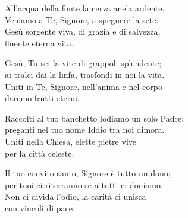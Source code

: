 
\strofa All'acqua della fonte la cerva anela ardente.\\
Veniamo a Te, Signore, a spegnere la sete.\\
Gesù sorgente viva, di grazia e di salvezza,\\
fluente eterna vita.

\spazio

\strofa Gesù, Tu sei la vite di grappoli splendente;\\
ai tralci dai la linfa, trasfondi in noi la vita.\\
Uniti in Te, Signore, nell'anima e nel corpo\\
daremo frutti eterni.

\spazio

\strofa Raccolti al tuo banchetto lodiamo un solo Padre:\\
preganti nel tuo nome Iddio tra noi dimora.\\
Uniti nella Chiesa, elette pietre vive\\
per la città celeste.

\spazio

\strofa Il tuo convito santo, Signore è tutto un dono;\\
per tuoi ci riterranno se a tutti ci doniamo.\\
Non ci divida l'odio, la carità ci unisca\\
con vincoli di pace.